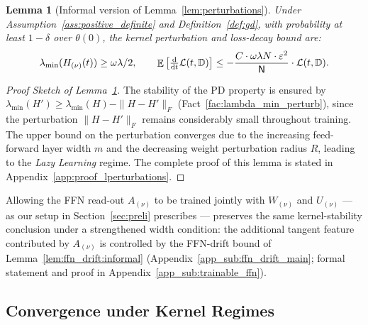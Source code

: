 \documentclass[11pt]{article}
\theoremstyle{plain}
\newtheorem{lemma}[theorem]{Lemma}
\renewcommand{\d}{\mathrm{d}}
\DeclareMathOperator*{\E}{{\mathbb{E}}}
\begin{document}
\begin{lemma}[Informal version of Lemma~\ref{lem:perturbations}]\label{lem:perturbations:informal}
    Under Assumption~\ref{ass:positive_definite} and Definition~\ref{def:gd}, with probability at least $1-\delta$ over $\theta(0)$, the kernel perturbation and loss-decay bound are:
    \begin{align*}
        \lambda_{\min}(H_{(\nu)}(t)) \ge \omega\lambda/2,\qquad \E\big[\tfrac{\d}{\d t}{\cal L}(t,\mathbb{D})\big] \le -\frac{C\cdot\omega\lambda N\cdot \varepsilon^2}{\mathsf{N}}\cdot {\cal L}(t,\mathbb{D}).
    \end{align*}
\end{lemma}
\begin{proof}[Proof Sketch of Lemma~\ref{lem:perturbations:informal}]
    The stability of the PD property is ensured by $\lambda_{\min}(H') \ge \lambda_{\min}(H) - \| H - H' \|_F$ (Fact~\ref{fac:lambda_min_perturb}), since the perturbation $\| H - H' \|_F$ remains considerably small throughout training. The upper bound on the perturbation converges due to the increasing feed-forward layer width $m$ and the decreasing weight perturbation radius $R$, leading to the {\it Lazy Learning} regime. The complete proof of this lemma is stated in Appendix~\ref{app:proof_lperturbations}.
\end{proof}

 Allowing the FFN read-out $A_{(\nu)}$ to be trained jointly with $W_{(\nu)}$ and $U_{(\nu)}$ --- as our setup in Section~\ref{sec:preli} prescribes --- preserves the same kernel-stability conclusion under a strengthened width condition: the additional tangent feature contributed by $A_{(\nu)}$ is controlled by the FFN-drift bound of Lemma~\ref{lem:ffn_drift:informal} (Appendix~\ref{app_sub:ffn_drift_main}; formal statement and proof in Appendix~\ref{app_sub:trainable_ffn}).

\subsection{Convergence under Kernel Regimes}\label{sub:main_reults}
\end{document}
